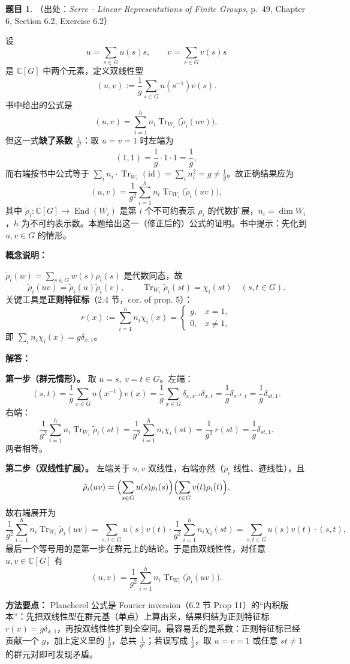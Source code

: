 \documentclass[a4paper]{ctexart}
\theoremstyle{definition}
\newtheorem{example}{题目}[section]
\theoremstyle{analysis}
\theoremstyle{plain}
\begin{document}
\begin{example}
（出处：\textit{Serre - Linear Representations of Finite Groups}, p.~49, Chapter 6, Section 6.2, Exercise 6.2）

设
\[
  u=\sum_{s\in G}u(s)s,\qquad v=\sum_{s\in G}v(s)s
\]
是 \(\mathbb C[G]\) 中两个元素，定义双线性型
\[
  (u,v):=\frac{1}{g}\sum_{s\in G}u(s^{-1})v(s).
\]
书中给出的公式是
\[
  (u,v)=\sum_{i=1}^{h}n_i\operatorname{Tr}_{W_i}\bigl(\tilde\rho_i(uv)\bigr),
\]
但这一式\textbf{缺了系数 \(\frac{1}{g^2}\)}：取 \(u=v=1\) 时左端为
\[
  (1,1)=\frac{1}{g}\cdot 1\cdot 1=\frac{1}{g},
\]
而右端按书中公式等于 \(\sum_i n_i\cdot \operatorname{Tr}_{W_i}(\mathrm{id})=\sum_i n_i^2=g\neq\frac{1}{g}\)。故正确结果应为
\[
  \boxed{(u,v)=\frac{1}{g^2}\sum_{i=1}^{h}n_i\operatorname{Tr}_{W_i}\bigl(\tilde\rho_i(uv)\bigr),}
\]
其中 \(\tilde\rho_i:\mathbb C[G]\to\operatorname{End}(W_i)\) 是第 \(i\) 个不可约表示 \(\rho_i\) 的代数扩展，\(n_i=\dim W_i\)，\(h\) 为不可约表示数。本题给出这一（修正后的）公式的证明。书中提示：先化到 \(u,v\in G\) 的情形。

\textbf{概念说明：}

\(\tilde\rho_i(w)=\sum_{s\in G}w(s)\rho_i(s)\) 是代数同态，故
\[
  \tilde\rho_i(uv)=\tilde\rho_i(u)\tilde\rho_i(v),\qquad
  \operatorname{Tr}_{W_i}\tilde\rho_i(st)=\chi_i(st)\quad(s,t\in G).
\]
关键工具是\textbf{正则特征标}（2.4 节，cor. of prop. 5）：
\[
  r(x):=\sum_{i=1}^{h}n_i\chi_i(x)
  =
  \begin{cases}
    g,&x=1,\\
    0,&x\neq 1,
  \end{cases}
\]
即 \(\sum_i n_i\chi_i(x)=g\delta_{x,1}\)。

\textbf{解答：}

\textbf{第一步（群元情形）。} 取 \(u=s,\ v=t\in G\)。左端：
\[
  (s,t)=\frac{1}{g}\sum_{x\in G}u(x^{-1})v(x)
  =\frac{1}{g}\sum_{x\in G}\delta_{x,s^{-1}}\delta_{x,t}
  =\frac{1}{g}\delta_{s^{-1},t}
  =\frac{1}{g}\delta_{st,1}.
\]
右端：
\[
  \frac{1}{g^2}\sum_{i=1}^{h}n_i\operatorname{Tr}_{W_i}\tilde\rho_i(st)
  =\frac{1}{g^2}\sum_{i=1}^{h}n_i\chi_i(st)
  =\frac{1}{g^2}\,r(st)
  =\frac{1}{g}\delta_{st,1}.
\]
两者相等。

\textbf{第二步（双线性扩展）。} 左端关于 \(u,v\) 双线性，右端亦然（\(\tilde\rho_i\) 线性、迹线性），且
\[
  \tilde\rho_i(uv)
  =\Bigl(\sum_{s\in G}u(s)\rho_i(s)\Bigr)\Bigl(\sum_{t\in G}v(t)\rho_i(t)\Bigr),
\]
故右端展开为
\[
  \frac{1}{g^2}\sum_{i=1}^{h}n_i\operatorname{Tr}_{W_i}\tilde\rho_i(uv)
  =
  \sum_{s,t\in G}u(s)v(t)\cdot\frac{1}{g^2}\sum_{i=1}^{h}n_i\chi_i(st)
  =
  \sum_{s,t\in G}u(s)v(t)\cdot(s,t),
\]
最后一个等号用的是第一步在群元上的结论。于是由双线性性，对任意 \(u,v\in\mathbb C[G]\) 有
\[
  (u,v)=\frac{1}{g^2}\sum_{i=1}^{h}n_i\operatorname{Tr}_{W_i}\bigl(\tilde\rho_i(uv)\bigr).
\]

\textbf{方法要点：}
Plancherel 公式是 Fourier inversion（6.2 节 Prop 11）的“内积版本”：先把双线性型在群元基（单点）上算出来，结果归结为正则特征标 \(r(x)=g\delta_{x,1}\)，再按双线性性扩到全空间。最容易丢的是系数：正则特征标已经贡献一个 \(g\)，加上定义里的 \(\frac{1}{g}\)，总共 \(\frac{1}{g^2}\)；若误写成 \(\frac{1}{g}\)，取 \(u=v=1\) 或任意 \(st\neq 1\) 的群元对即可发现矛盾。
\end{example}
\end{document}
